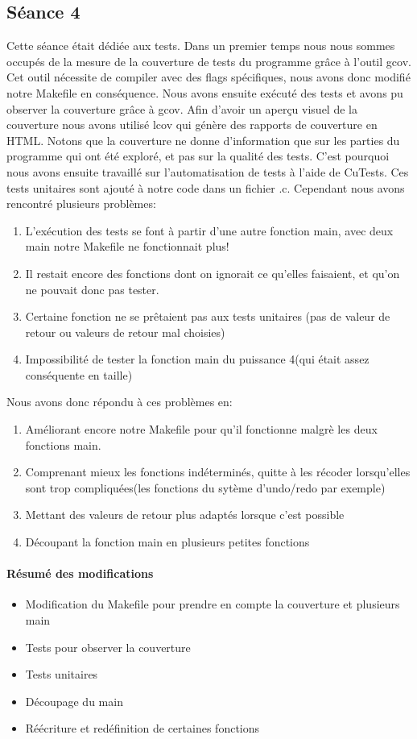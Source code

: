 \documentclass{article}
\begin{document}
\subsection{Séance 4}

Cette séance était dédiée aux tests. Dans un premier temps nous nous sommes occupés de la mesure de la couverture de tests du programme grâce à l'outil gcov. Cet outil nécessite de compiler avec des flags spécifiques, nous avons donc modifié notre Makefile en conséquence. Nous avons ensuite exécuté des tests et avons pu observer la couverture grâce à gcov. Afin d'avoir un aperçu visuel de la couverture nous avons utilisé lcov qui génère des rapports de couverture en HTML. Notons que la couverture ne donne d'information que sur les parties du programme qui ont été exploré, et pas sur la qualité des tests.
C'est pourquoi nous avons ensuite travaillé sur l'automatisation de tests à l'aide de CuTests. Ces tests unitaires sont ajouté à notre code dans un fichier .c. Cependant nous avons rencontré plusieurs problèmes:
\begin{enumerate}
\item L'exécution des tests se font à partir d'une autre fonction main, avec deux main notre Makefile ne fonctionnait plus!
\item Il restait encore des fonctions dont on ignorait ce qu'elles faisaient, et qu'on ne pouvait donc pas tester.
\item Certaine fonction ne se prêtaient pas aux tests unitaires (pas de valeur de retour ou valeurs de retour mal choisies)
\item Impossibilité de tester la fonction main du puissance 4(qui était assez conséquente en taille)
\end{enumerate}

Nous avons donc répondu à ces problèmes en:
\begin{enumerate}
\item Améliorant encore notre Makefile pour qu'il fonctionne malgrè les deux fonctions main.
\item Comprenant mieux les fonctions indéterminés, quitte à les récoder lorsqu'elles sont trop compliquées(les fonctions du sytème d'undo/redo par exemple)
\item Mettant des valeurs de retour plus adaptés lorsque c'est possible
\item Découpant la fonction main en plusieurs petites fonctions
\end{enumerate}

\paragraph{Résumé des modifications}
\begin{itemize}
\item Modification du Makefile pour prendre en compte la couverture et plusieurs main
\item Tests pour observer la couverture
\item Tests unitaires
\item Découpage du main
\item Réécriture et redéfinition de certaines fonctions
\end{itemize}
\end{document}
